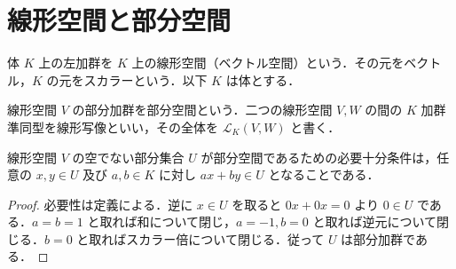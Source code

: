 \section{線形空間と部分空間}
\begin{defn}[線形空間]
体 $K$ 上の左加群を $K$ 上の線形空間（ベクトル空間）という．その元をベクトル，$K$ の元をスカラーという．以下 $K$ は体とする．
\end{defn}
\begin{defn}[部分空間と線形写像]
線形空間 $V$ の部分加群を部分空間という．二つの線形空間 $V,W$ の間の $K$ 加群準同型を線形写像といい，その全体を $\mathcal L_K(V,W)$ と書く．
\end{defn}
\begin{prop}[部分空間の判定]
線形空間 $V$ の空でない部分集合 $U$ が部分空間であるための必要十分条件は，任意の $x,y\in U$ 及び $a,b\in K$ に対し $ax+by\in U$ となることである．
\end{prop}
\begin{proof}
必要性は定義による．逆に $x\in U$ を取ると $0x+0x=0$ より $0\in U$ である．$a=b=1$ と取れば和について閉じ，$a=-1,b=0$ と取れば逆元について閉じる．$b=0$ と取ればスカラー倍について閉じる．従って $U$ は部分加群である．
\end{proof}

